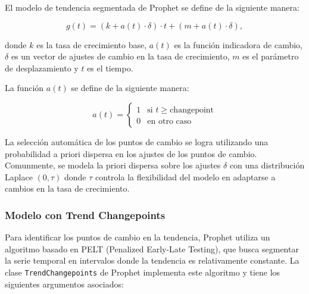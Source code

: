 \documentclass{article}[14pts]
\begin{document}
    El modelo de tendencia segmentada de Prophet se define de la siguiente manera: 

     \begin{equation*}
       g(t) = (k + a(t) \cdot \delta) \cdot t + (m + a(t)\cdot \delta),
     \end{equation*}

    donde $k$ es la tasa de crecimiento base, $a(t)$ es la función indicadora de cambio, $\delta$ es un vector de ajustes de cambio en la tasa de crecimiento, $m$ es el parámetro de desplazamiento y $t$ es el tiempo. 

    La función $a(t)$ se define de la siguiente manera:

     \begin{equation*}
       a(t) = \begin{cases} 
              1 & \text{si } t \geq \text{changepoint} \\
              0 & \text{en otro caso}
              \end{cases}
     \end{equation*}

    La selección automática de los puntos de cambio se logra utilizando una probabilidad a priori dispersa en los ajustes de los puntos de cambio. Comunmente, se modela la priori dispersa sobre los ajustes $\delta$ con una distribución Laplace $(0, \tau)$ donde $\tau$ controla la flexibilidad del modelo en adaptarse a cambios en la tasa de crecimiento.
  
    \subsubsection{Modelo con Trend Changepoints}

      Para identificar los puntos de cambio en la tendencia, Prophet utiliza un algoritmo basado en PELT (Penalized Early-Late Testing), que busca segmentar la serie temporal en intervalos donde la tendencia es relativamente constante. La clase \texttt{TrendChangepoints} de Prophet implementa este algoritmo y tiene los siguientes argumentos asociados:
\end{document}
